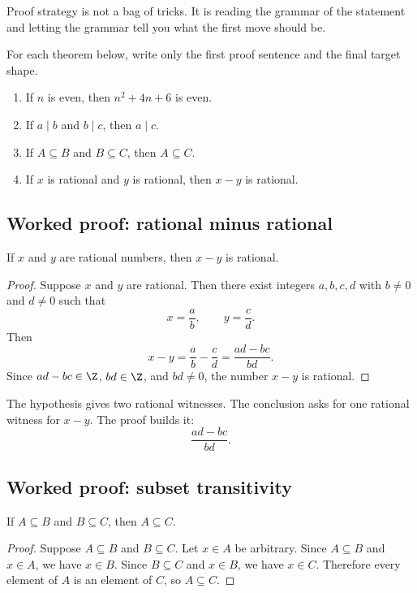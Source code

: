 Proof strategy is not a bag of tricks. It is reading the grammar of the statement and letting the grammar tell you what the first move should be.

\begin{labbox}
For each theorem below, write only the first proof sentence and the final target shape.

\begin{enumerate}
\item If $n$ is even, then $n^2+4n+6$ is even.
\item If $a\mid b$ and $b\mid c$, then $a\mid c$.
\item If $A\subseteq B$ and $B\subseteq C$, then $A\subseteq C$.
\item If $x$ is rational and $y$ is rational, then $x-y$ is rational.
\end{enumerate}
\end{labbox}

\subsection{Worked proof: rational minus rational}

\begin{theorem}
If $x$ and $y$ are rational numbers, then $x-y$ is rational.
\end{theorem}

\begin{proof}
Suppose $x$ and $y$ are rational. Then there exist integers $a,b,c,d$ with $b\neq0$ and $d\neq0$ such that
\[
x=\frac ab,\qquad y=\frac cd.
\]
Then
\[
x-y=\frac ab-\frac cd=\frac{ad-bc}{bd}.
\]
Since $ad-bc\in\Z$, $bd\in\Z$, and $bd\neq0$, the number $x-y$ is rational.
\end{proof}

The hypothesis gives two rational witnesses. The conclusion asks for one rational witness for $x-y$. The proof builds it:
\[
\frac{ad-bc}{bd}.
\]

\subsection{Worked proof: subset transitivity}

\begin{theorem}
If $A\subseteq B$ and $B\subseteq C$, then $A\subseteq C$.
\end{theorem}

\begin{proof}
Suppose $A\subseteq B$ and $B\subseteq C$. Let $x\in A$ be arbitrary. Since $A\subseteq B$ and $x\in A$, we have $x\in B$. Since $B\subseteq C$ and $x\in B$, we have $x\in C$. Therefore every element of $A$ is an element of $C$, so $A\subseteq C$.
\end{proof}

